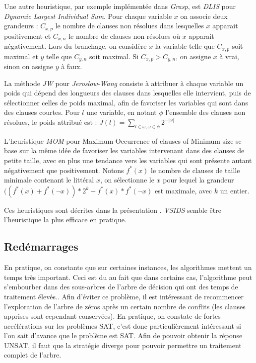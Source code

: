 Une autre heuristique, par exemple implémentée dans \emph{Grasp}, est
\emph{DLIS} pour \emph{Dynamic Largest Individual Sum}. Pour chaque variable
$x$ on associe deux grandeurs : $C_{x,p}$ le nombre de clauses non résolues
dans lesquelles $x$ apparait positivement et $C_{x,n}$ le nombre de clauses non
résolues où $x$ apparait négativement. Lors du branchage, on considère $x$ la
variable telle que $C_{x,p}$ soit maximal et $y$ telle que $C_{y,n}$ soit
maximal. Si $C_{x,p} > C_{y,n}$, on assigne $x$ à vrai, sinon on assigne $y$ à
faux.

La méthode \emph{JW} pour \emph{Jeroslow-Wang} consiste à attribuer à chaque
variable un poids qui dépend des longueurs des clauses dans lesquelles elle
intervient, puis de sélectionner celles de poids maximal, afin de favoriser
les variables qui sont dans des clauses courtes. Pour $l$ une variable, en
notant $\phi$ l'ensemble des clauses non résolues, le poids attribué est :
$J(l) = \sum_{l\in\omega,\omega\in\phi} 2^{-|\omega|}$

L'heuristique \emph{MOM} pour {Maximum Occurrence of clauses of Minimum size}
se base sur la même idée de favoriser les variables intervenant dans des
clauses de petite taille, avec en plus une tendance vers les variables qui
sont présente autant négativement que positivement. Notons $f^*(x)$ le nombre
de clauses de taille minimale contenant le littéral $x$, on sélectionne le $x$
pour lequel la grandeur $((f^*(x) + f^*(\neg x)) * 2^k + f^*(x)*f^*(\neg x)$
est maximale, avec $k$ un entier.

Ces heuristiques sont décrites dans la présentation \cite{heuriSAT}.
\emph{VSIDS} semble être l'heuristique la plus efficace en pratique\cite{VSIDS}.

\subsection{Redémarrages}\label{restart}
En pratique, on constante que sur certaines instances, les algorithmes mettent
un temps très important. Ceci est du au fait que dans certains cas,
l'algorithme peut s'embourber dans des sous-arbres de l'arbre de décision qui
ont des temps de traitement élevés.. Afin d'éviter ce problème, il est
intéressant de recommencer l'exploration de l'arbre de zéros après un certain
nombre de conflits (les clauses apprises sont cependant conservées). En
pratique, on constate de fortes accélérations sur les problèmes SAT, c'est
donc particulièrement intéressant si l'on sait d'avance que le problème est
SAT. Afin de pouvoir obtenir la réponse UNSAT, il faut que la stratégie
diverge pour pouvoir permettre un traitement complet de l'arbre.

